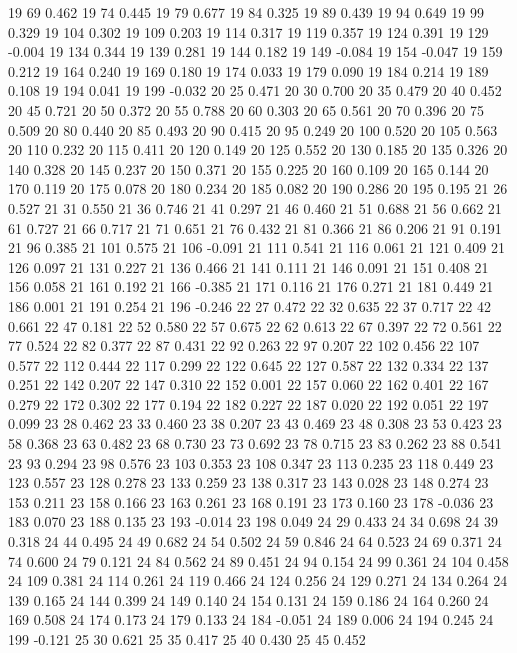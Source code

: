 19 69 0.462
19 74 0.445
19 79 0.677
19 84 0.325
19 89 0.439
19 94 0.649
19 99 0.329
19 104 0.302
19 109 0.203
19 114 0.317
19 119 0.357
19 124 0.391
19 129 -0.004
19 134 0.344
19 139 0.281
19 144 0.182
19 149 -0.084
19 154 -0.047
19 159 0.212
19 164 0.240
19 169 0.180
19 174 0.033
19 179 0.090
19 184 0.214
19 189 0.108
19 194 0.041
19 199 -0.032
20 25 0.471
20 30 0.700
20 35 0.479
20 40 0.452
20 45 0.721
20 50 0.372
20 55 0.788
20 60 0.303
20 65 0.561
20 70 0.396
20 75 0.509
20 80 0.440
20 85 0.493
20 90 0.415
20 95 0.249
20 100 0.520
20 105 0.563
20 110 0.232
20 115 0.411
20 120 0.149
20 125 0.552
20 130 0.185
20 135 0.326
20 140 0.328
20 145 0.237
20 150 0.371
20 155 0.225
20 160 0.109
20 165 0.144
20 170 0.119
20 175 0.078
20 180 0.234
20 185 0.082
20 190 0.286
20 195 0.195
21 26 0.527
21 31 0.550
21 36 0.746
21 41 0.297
21 46 0.460
21 51 0.688
21 56 0.662
21 61 0.727
21 66 0.717
21 71 0.651
21 76 0.432
21 81 0.366
21 86 0.206
21 91 0.191
21 96 0.385
21 101 0.575
21 106 -0.091
21 111 0.541
21 116 0.061
21 121 0.409
21 126 0.097
21 131 0.227
21 136 0.466
21 141 0.111
21 146 0.091
21 151 0.408
21 156 0.058
21 161 0.192
21 166 -0.385
21 171 0.116
21 176 0.271
21 181 0.449
21 186 0.001
21 191 0.254
21 196 -0.246
22 27 0.472
22 32 0.635
22 37 0.717
22 42 0.661
22 47 0.181
22 52 0.580
22 57 0.675
22 62 0.613
22 67 0.397
22 72 0.561
22 77 0.524
22 82 0.377
22 87 0.431
22 92 0.263
22 97 0.207
22 102 0.456
22 107 0.577
22 112 0.444
22 117 0.299
22 122 0.645
22 127 0.587
22 132 0.334
22 137 0.251
22 142 0.207
22 147 0.310
22 152 0.001
22 157 0.060
22 162 0.401
22 167 0.279
22 172 0.302
22 177 0.194
22 182 0.227
22 187 0.020
22 192 0.051
22 197 0.099
23 28 0.462
23 33 0.460
23 38 0.207
23 43 0.469
23 48 0.308
23 53 0.423
23 58 0.368
23 63 0.482
23 68 0.730
23 73 0.692
23 78 0.715
23 83 0.262
23 88 0.541
23 93 0.294
23 98 0.576
23 103 0.353
23 108 0.347
23 113 0.235
23 118 0.449
23 123 0.557
23 128 0.278
23 133 0.259
23 138 0.317
23 143 0.028
23 148 0.274
23 153 0.211
23 158 0.166
23 163 0.261
23 168 0.191
23 173 0.160
23 178 -0.036
23 183 0.070
23 188 0.135
23 193 -0.014
23 198 0.049
24 29 0.433
24 34 0.698
24 39 0.318
24 44 0.495
24 49 0.682
24 54 0.502
24 59 0.846
24 64 0.523
24 69 0.371
24 74 0.600
24 79 0.121
24 84 0.562
24 89 0.451
24 94 0.154
24 99 0.361
24 104 0.458
24 109 0.381
24 114 0.261
24 119 0.466
24 124 0.256
24 129 0.271
24 134 0.264
24 139 0.165
24 144 0.399
24 149 0.140
24 154 0.131
24 159 0.186
24 164 0.260
24 169 0.508
24 174 0.173
24 179 0.133
24 184 -0.051
24 189 0.006
24 194 0.245
24 199 -0.121
25 30 0.621
25 35 0.417
25 40 0.430
25 45 0.452
